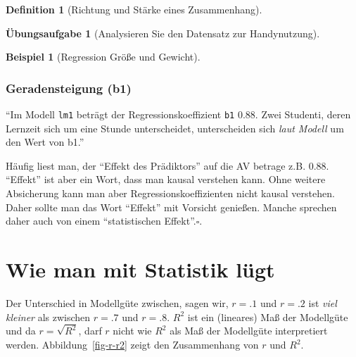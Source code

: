 \documentclass[
  a4paper,
  DIV=11]{scrreprt}
\theoremstyle{definition}
\newtheorem{exercise}{Übungsaufgabe}[chapter]
\theoremstyle{definition}
\newtheorem{example}{Beispiel}[chapter]
\theoremstyle{definition}
\newtheorem{definition}{Definition}[chapter]
\theoremstyle{remark}
\begin{document}
\begin{definition}[Richtung und Stärke eines
Zusammenhang]
\begin{exercise}[Analysieren Sie den Datensatz zur
Handynutzung]
\begin{example}[Regression Größe und
Gewicht]
\end{example}

\subsubsection{Geradensteigung (b1)}\label{geradensteigung-b1}

``Im Modell \texttt{lm1} beträgt der Regressionskoeffizient \texttt{b1}
\(0.88\). Zwei Studenti, deren Lernzeit sich um eine Stunde
unterscheidet, unterscheiden sich \emph{laut Modell} um den Wert von
b1.''

\begin{tcolorbox}[enhanced jigsaw, leftrule=.75mm, opacitybacktitle=0.6, colback=white, colframe=quarto-callout-caution-color-frame, coltitle=black, colbacktitle=quarto-callout-caution-color!10!white, opacityback=0, left=2mm, breakable, titlerule=0mm, toptitle=1mm, bottomtitle=1mm, rightrule=.15mm, title=\textcolor{quarto-callout-caution-color}{\faFire}\hspace{0.5em}{Vorsicht}, arc=.35mm, bottomrule=.15mm, toprule=.15mm]

Häufig liest man, der ``Effekt des Prädiktors'' auf die AV betrage z.B.
\(0.88\). ``Effekt'' ist aber ein Wort, dass man kausal verstehen kann.
Ohne weitere Absicherung kann man aber Regressionskoeffizienten nicht
kausal verstehen. Daher sollte man das Wort ``Effekt'' mit Vorsicht
genießen. Manche sprechen daher auch von einem ``statistischen
Effekt''.\(\square\).

\end{tcolorbox}

\section{Wie man mit Statistik
lügt}\label{wie-man-mit-statistik-luxfcgt-4}

Der Unterschied in Modellgüte zwischen, sagen wir, \(r=.1\) und \(r=.2\)
ist \emph{viel kleiner} als zwischen \(r=.7\) und \(r=.8\). \(R^2\) ist
ein (lineares) Maß der Modellgüte und da \(r = \sqrt{R^2}\), darf \(r\)
nicht wie \(R^2\) als Maß der Modellgüte interpretiert werden.
Abbildung~\ref{fig-r-r2} zeigt den Zusammenhang von \(r\) und \(R^2\).

\begin{figure}

\centering{

}
\end{figure}
\end{exercise}
\end{definition}
\end{document}
